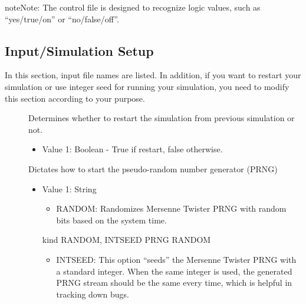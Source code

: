 \documentclass[letterpaper,10pt,english]{sphinxmanual}
\begin{document}
\begin{sphinxadmonition}{note}{Note:}
The control file is designed to recognize logic values, such as “yes/true/on” or “no/false/off”.
\end{sphinxadmonition}


\subsection{Input/Simulation Setup}
\label{\detokenize{input_file:input-simulation-setup}}
In this section, input file names are listed. In addition, if you want to restart your simulation or use integer seed for running your simulation, you need to modify this section according to your purpose.
\begin{description}
\item[{}] \leavevmode
Determines whether to restart the simulation from previous simulation or not.
\begin{itemize}
\item {} 
Value 1: Boolean - True if restart, false otherwise.

\end{itemize}

\item[{}] \leavevmode
Dictates how to start the pseudo-random number generator (PRNG)
\begin{itemize}
\item {} 
Value 1: String
\begin{itemize}
\item {} 
RANDOM: Randomizes Mersenne Twister PRNG with random bits based on the system time.

\end{itemize}

%
\begin{sphinxVerbatim}[commandchars=\\\{\}]
\PYGZsh{}\PYGZsh{}\PYGZsh{}\PYGZsh{}\PYGZsh{}\PYGZsh{}\PYGZsh{}\PYGZsh{}\PYGZsh{}\PYGZsh{}\PYGZsh{}\PYGZsh{}\PYGZsh{}\PYGZsh{}\PYGZsh{}\PYGZsh{}\PYGZsh{}\PYGZsh{}\PYGZsh{}\PYGZsh{}\PYGZsh{}\PYGZsh{}\PYGZsh{}\PYGZsh{}\PYGZsh{}\PYGZsh{}\PYGZsh{}\PYGZsh{}\PYGZsh{}\PYGZsh{}\PYGZsh{}\PYGZsh{}\PYGZsh{}
\PYGZsh{} kind \PYGZob{}RANDOM, INTSEED\PYGZcb{}
\PYGZsh{}\PYGZsh{}\PYGZsh{}\PYGZsh{}\PYGZsh{}\PYGZsh{}\PYGZsh{}\PYGZsh{}\PYGZsh{}\PYGZsh{}\PYGZsh{}\PYGZsh{}\PYGZsh{}\PYGZsh{}\PYGZsh{}\PYGZsh{}\PYGZsh{}\PYGZsh{}\PYGZsh{}\PYGZsh{}\PYGZsh{}\PYGZsh{}\PYGZsh{}\PYGZsh{}\PYGZsh{}\PYGZsh{}\PYGZsh{}\PYGZsh{}\PYGZsh{}\PYGZsh{}\PYGZsh{}\PYGZsh{}\PYGZsh{}
PRNG RANDOM
\end{sphinxVerbatim}
\begin{itemize}
\item {} 
INTSEED: This option “seeds” the Mersenne Twister PRNG with a standard integer. When the same integer is used, the generated PRNG stream should be the same every time, which is helpful in tracking down bugs.


\end{itemize}
\end{itemize}
\end{description}
\end{document}
